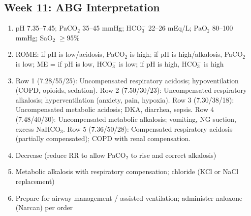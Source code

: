 \documentclass[11pt,letterpaper]{article}
\begin{document}
\begin{keybox}
\subsection*{Week 11: ABG Interpretation}
\begin{enumerate}[leftmargin=1.5em,label=\textbf{\arabic*.},start=131]
  \item pH 7.35--7.45; PaCO$_2$ 35--45 mmHg; HCO$_3^-$ 22--26 mEq/L;
        PaO$_2$ 80--100 mmHg; SaO$_2$ $\geq$95\%
  \item ROME: if pH is low/acidosis, PaCO$_2$ is high; if pH is high/alkalosis,
        PaCO$_2$ is low; ME = if pH is low, HCO$_3^-$ is low; if pH is high,
        HCO$_3^-$ is high
  \item Row 1 (7.28/55/25): Uncompensated respiratory acidosis; hypoventilation (COPD, opioids,
        sedation). Row 2 (7.50/30/23): Uncompensated respiratory alkalosis; hyperventilation
        (anxiety, pain, hypoxia). Row 3 (7.30/38/18): Uncompensated metabolic acidosis;
        DKA, diarrhea, sepsis. Row 4 (7.48/40/30): Uncompensated metabolic alkalosis;
        vomiting, NG suction, excess NaHCO$_3$. Row 5 (7.36/50/28): Compensated respiratory
        acidosis (partially compensated); COPD with renal compensation.
  \item Decrease (reduce RR to allow PaCO$_2$ to rise and correct alkalosis)
  \item Metabolic alkalosis with respiratory compensation;
        chloride (KCl or NaCl replacement)
  \item Prepare for airway management / assisted ventilation; administer naloxone (Narcan)
        per order
\end{enumerate}

\hrulefill

\end{keybox}
\end{document}
